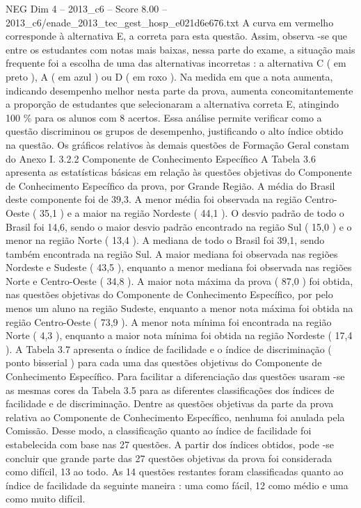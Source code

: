 \begin{textsample}{NEG Dim 4 – 2013\_c6 – Score 8.00 – 2013\_c6/enade\_2013\_tec\_gest\_hosp\_e021d6e676.txt}
A curva em vermelho corresponde à alternativa E, a correta para esta questão.
Assim, observa -se que entre os estudantes com notas mais baixas, nessa parte do exame, a situação mais frequente foi a escolha de uma das alternativas incorretas : a alternativa C ( em preto ), A ( em azul ) ou D ( em roxo ).
Na medida em que a nota aumenta, indicando desempenho melhor nesta parte da prova, aumenta concomitantemente a proporção de estudantes que selecionaram a alternativa correta E, atingindo 100 \% para os alunos com 8 acertos.
Essa análise permite verificar como a questão discriminou os grupos de desempenho, justificando o alto índice obtido na questão.
Os gráficos relativos às demais questões de Formação Geral constam do Anexo I. 3.2.2 Componente de Conhecimento Específico A Tabela 3.6 apresenta as estatísticas básicas em relação às questões objetivas do Componente de Conhecimento Específico da prova, por Grande Região.
A média do Brasil deste componente foi de 39,3.
A menor média foi observada na região Centro-Oeste ( 35,1 ) e a maior na região Nordeste ( 44,1 ).
O desvio padrão de todo o Brasil foi 14,6, sendo o maior desvio padrão encontrado na região Sul ( 15,0 ) e o menor na região Norte ( 13,4 ).
A mediana de todo o Brasil foi 39,1, sendo também encontrada na região Sul.
A maior mediana foi observada nas regiões Nordeste e Sudeste ( 43,5 ), enquanto a menor mediana foi observada nas regiões Norte e Centro-Oeste ( 34,8 ).
A maior nota máxima da prova ( 87,0 ) foi obtida, nas questões objetivas do Componente de Conhecimento Específico, por pelo menos um aluno na região Sudeste, enquanto a menor nota máxima foi obtida na região Centro-Oeste ( 73,9 ).
A menor nota mínima foi encontrada na região Norte ( 4,3 ), enquanto a maior nota mínima foi obtida na região Nordeste ( 17,4 ).
A Tabela 3.7 apresenta o índice de facilidade e o índice de discriminação ( ponto bisserial ) para cada uma das questões objetivas do Componente de Conhecimento Específico.
Para facilitar a diferenciação das questões usaram -se as mesmas cores da Tabela 3.5 para as diferentes classificações dos índices de facilidade e de discriminação.
Dentre as questões objetivas da parte da prova relativa ao Componente de Conhecimento Específico, nenhuma foi anulada pela Comissão.
Desse modo, a classificação quanto ao índice de facilidade foi estabelecida com base nas 27 questões.
A partir dos índices obtidos, pode -se concluir que grande parte das 27 questões objetivas da prova foi considerada como difícil, 13 ao todo.
As 14 questões restantes foram classificadas quanto ao índice de facilidade da seguinte maneira : uma como fácil, 12 como médio e uma como muito difícil.

\end{textsample}
